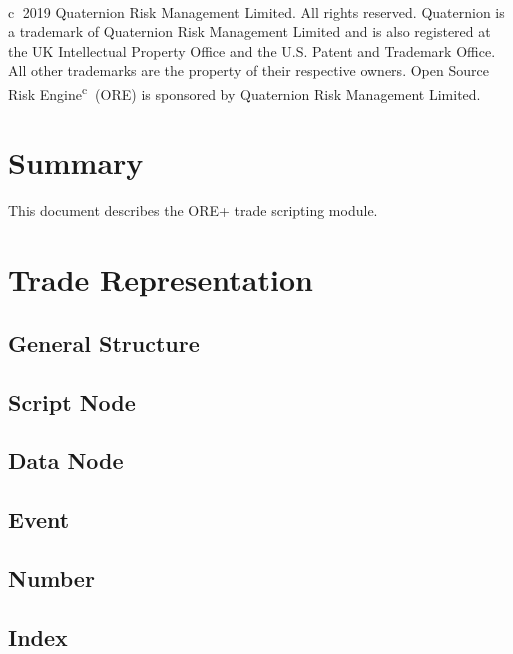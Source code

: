 \documentclass[12pt, a4paper]{article}
\begin{document}
\textcircled{c} 2019 Quaternion Risk Management Limited.  All rights reserved.
Quaternion\textsuperscript{\textregistered} is a trademark of Quaternion Risk Management Limited and is also registered
at the UK Intellectual Property Office and the U.S. Patent and Trademark Office.  All other trademarks are the property
of their respective owners. Open Source Risk Engine\textsuperscript{\textcircled{c}} (ORE) is sponsored by Quaternion
Risk Management Limited.

\newpage

\section{Summary}

This document describes the ORE+ trade scripting module.

\section{Trade Representation}

\subsection{General Structure}\label{generalStructure}


\subsection{Script Node}\label{scriptNode}


\subsection{Data Node}\label{dataNode}


\subsection{Event}\label{event}


\subsection{Number}


\subsection{Index}\label{data_index}

\end{document}
